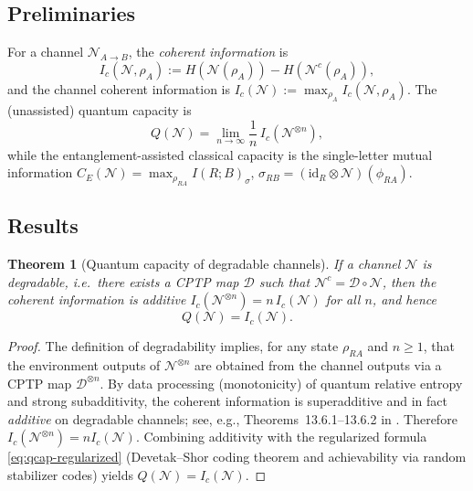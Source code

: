 \documentclass[11pt]{article}
\theoremstyle{plain}
\newtheorem{theorem}{Theorem}[section]
\theoremstyle{definition}
\numberwithin{equation}{section}
\begin{document}
\subsection{Preliminaries}
For a channel $\mathcal{N}_{A\to B}$, the \emph{coherent information} is
\begin{equation}
 I_c(\mathcal{N},\rho_A) := H(\mathcal{N}(\rho_A)) - H(\mathcal{N}^c(\rho_A)),
\end{equation}
and the channel coherent information is $I_c(\mathcal{N}):=\max_{\rho_A} I_c(\mathcal{N},\rho_A)$.
The (unassisted) quantum capacity is
\begin{equation}
 Q(\mathcal{N}) = \lim_{n\to\infty} \frac{1}{n}\, I_c\!\left(\mathcal{N}^{\otimes n}\right),
 \label{eq:qcap-regularized}
\end{equation}
while the entanglement-assisted classical capacity is the single-letter mutual information
$C_E(\mathcal{N}) = \max_{\rho_{RA}} I(R;B)_{\sigma}$, $\sigma_{RB}=(\mathrm{id}_R\!\otimes\!\mathcal{N})(\phi_{RA})$.

\subsection{Results}

\begin{theorem}[Quantum capacity of degradable channels]\label{thm:degradable-single-letter}
If a channel $\mathcal{N}$ is degradable, i.e.\ there exists a CPTP map $\mathcal{D}$ such that
$\mathcal{N}^c = \mathcal{D}\!\circ\!\mathcal{N}$, then the coherent information is additive
$I_c(\mathcal{N}^{\otimes n}) = n\, I_c(\mathcal{N})$ for all $n$, and hence
\begin{equation}
 Q(\mathcal{N}) = I_c(\mathcal{N}).
\end{equation}
\end{theorem}

\begin{proof}
The definition of degradability implies, for any state $\rho_{RA}$ and $n\!\ge\!1$,
that the environment outputs of $\mathcal{N}^{\otimes n}$ are obtained from
the channel outputs via a CPTP map $\mathcal{D}^{\otimes n}$.
By data processing (monotonicity) of quantum relative entropy and strong subadditivity,
the coherent information is superadditive and in fact \emph{additive} on degradable channels;
see, e.g., Theorems~13.6.1--13.6.2 in \cite{Wilde2017QIT}.
Therefore $I_c(\mathcal{N}^{\otimes n}) = n I_c(\mathcal{N})$.
Combining additivity with the regularized formula \eqref{eq:qcap-regularized} (Devetak--Shor coding theorem
and achievability via random stabilizer codes) yields $Q(\mathcal{N})=I_c(\mathcal{N})$.
\end{proof}
\end{document}
